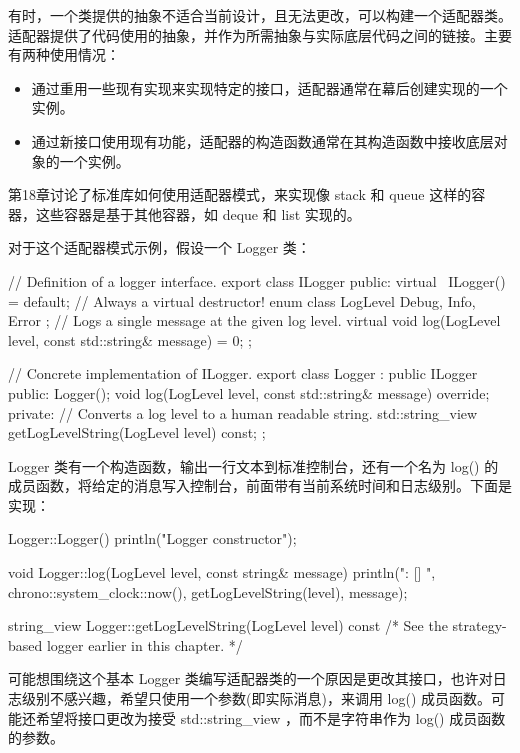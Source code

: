 有时，一个类提供的抽象不适合当前设计，且无法更改，可以构建一个适配器类。适配器提供了代码使用的抽象，并作为所需抽象与实际底层代码之间的链接。主要有两种使用情况：

\begin{itemize}
\item
通过重用一些现有实现来实现特定的接口，适配器通常在幕后创建实现的一个实例。

\item
通过新接口使用现有功能，适配器的构造函数通常在其构造函数中接收底层对象的一个实例。
\end{itemize}

第18章讨论了标准库如何使用适配器模式，来实现像 stack 和 queue 这样的容器，这些容器是基于其他容器，如 deque 和 list 实现的。


对于这个适配器模式示例，假设一个 Logger 类：

\begin{cpp}
// Definition of a logger interface.
export class ILogger
{
    public:
        virtual ~ILogger() = default; // Always a virtual destructor!
        enum class LogLevel { Debug, Info, Error };
        // Logs a single message at the given log level.
        virtual void log(LogLevel level, const std::string& message) = 0;
};

// Concrete implementation of ILogger.
export class Logger : public ILogger
{
    public:
        Logger();
        void log(LogLevel level, const std::string& message) override;
    private:
        // Converts a log level to a human readable string.
        std::string_view getLogLevelString(LogLevel level) const;
};
\end{cpp}

Logger 类有一个构造函数，输出一行文本到标准控制台，还有一个名为 log() 的成员函数，将给定的消息写入控制台，前面带有当前系统时间和日志级别。下面是实现：

\begin{cpp}
Logger::Logger() { println("Logger constructor"); }

void Logger::log(LogLevel level, const string& message)
{
    println("{}: [{}] {}", chrono::system_clock::now(),
    getLogLevelString(level), message);
}

string_view Logger::getLogLevelString(LogLevel level) const
{ /* See the strategy-based logger earlier in this chapter. */ }
\end{cpp}

可能想围绕这个基本 Logger 类编写适配器类的一个原因是更改其接口，也许对日志级别不感兴趣，希望只使用一个参数(即实际消息)，来调用 log() 成员函数。可能还希望将接口更改为接受 std::string\_view ，而不是字符串作为 log() 成员函数的参数。

